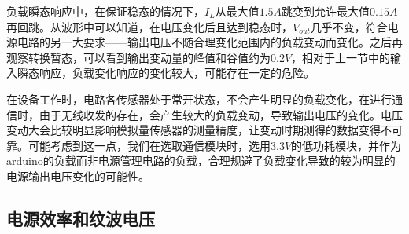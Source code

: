 \documentclass[a4paper, 11pt]{article} %
\begin{document}
负载瞬态响应中，在保证稳态的情况下，$I_L$从最大值$1.5A$跳变到允许最大值$0.15A$再回跳。从波形中可以知道，在电压变化后且达到稳态时，$V_{out}$几乎不变，符合电源电路的另一大要求——输出电压不随合理变化范围内的负载变动而变化。之后再观察转换暂态，可以看到输出变动量的峰值和谷值约为$0.2V$，相对于上一节中的输入瞬态响应，负载变化响应的变化较大，可能存在一定的危险。

在设备工作时，电路各传感器处于常开状态，不会产生明显的负载变化，在进行通信时，由于无线收发的存在，会产生较大的负载变动，导致输出电压的变化。电压变动大会比较明显影响模拟量传感器的测量精度，让变动时期测得的数据变得不可靠。可能考虑到这一点，我们在选取通信模块时，选用$3.3V$的低功耗模块，并作为arduino的负载而非电源管理电路的负载，合理规避了负载变化导致的较为明显的电源输出电压变化的可能性。

\subsection{电源效率和纹波电压}
\end{document}

